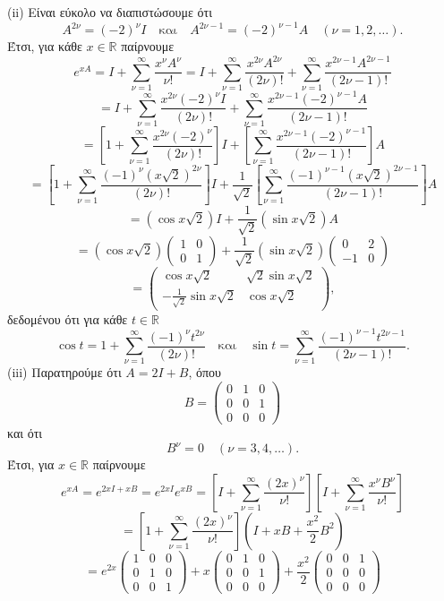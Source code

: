 \documentclass[11pt,a4paper,twoside]{book}
\begin{document}
(ii) Είναι εύκολο να διαπιστώσουμε ότι
\[
A^{2\nu} = (-2)^\nu I \quad \text{και} \quad A^{2\nu-1} = (-2)^{\nu-1} A \quad (\nu=1,2,\dots).
\]
Έτσι, για κάθε $x \in \mathbb{R}$ παίρνουμε
\[
e^{xA} = I + \sum_{\nu=1}^{\infty} \frac{x^\nu A^\nu}{\nu!} = I + \sum_{\nu=1}^{\infty} \frac{x^{2\nu} A^{2\nu}}{(2\nu)!} + \sum_{\nu=1}^{\infty} \frac{x^{2\nu-1} A^{2\nu-1}}{(2\nu-1)!}
\]
\[
= I + \sum_{\nu=1}^{\infty} \frac{x^{2\nu} (-2)^\nu I}{(2\nu)!} + \sum_{\nu=1}^{\infty} \frac{x^{2\nu-1} (-2)^{\nu-1} A}{(2\nu-1)!} 
\]
\[
= \left[ 1 + \sum_{\nu=1}^{\infty} \frac{x^{2\nu} (-2)^\nu}{(2\nu)!} \right] I + \left[ \sum_{\nu=1}^{\infty} \frac{x^{2\nu-1} (-2)^{\nu-1}}{(2\nu-1)!} \right] A 
\]
\[
= \left[ 1 + \sum_{\nu=1}^{\infty} \frac{(-1)^\nu (x\sqrt{2})^{2\nu}}{(2\nu)!} \right] I + \frac{1}{\sqrt{2}} \left[ \sum_{\nu=1}^{\infty} \frac{(-1)^{\nu-1} (x\sqrt{2})^{2\nu-1}}{(2\nu-1)!} \right] A 
\]
\[
= \left( \cos x\sqrt{2} \right) I + \frac{1}{\sqrt{2}} \left( \sin x\sqrt{2} \right) A 
\]
\[
= \left( \cos x\sqrt{2} \right) \begin{pmatrix} 1 & 0 \\ 0 & 1 \end{pmatrix} + \frac{1}{\sqrt{2}} \left( \sin x\sqrt{2} \right) \begin{pmatrix} 0 & 2 \\ -1 & 0 \end{pmatrix}
\]
\[
= \begin{pmatrix} \cos x\sqrt{2} & \sqrt{2} \sin x\sqrt{2} \\ -\frac{1}{\sqrt{2}} \sin x\sqrt{2} & \cos x\sqrt{2} \end{pmatrix},
\]
δεδομένου ότι για κάθε $t \in \mathbb{R}$
\[
\cos t = 1 + \sum_{\nu=1}^{\infty} \frac{(-1)^\nu t^{2\nu}}{(2\nu)!} \quad \text{και} \quad \sin t = \sum_{\nu=1}^{\infty} \frac{(-1)^{\nu-1} t^{2\nu-1}}{(2\nu-1)!}.
\]
(iii) Παρατηρούμε ότι $A = 2I+B$, όπου
\[
B = \begin{pmatrix} 0 & 1 & 0 \\ 0 & 0 & 1 \\ 0 & 0 & 0 \end{pmatrix}
\]
και ότι
\[
B^\nu = 0 \quad (\nu=3,4,\dots).
\]
Έτσι, για $x \in \mathbb{R}$ παίρνουμε
\[
e^{xA} = e^{2xI+xB} = e^{2xI} e^{xB} = \left[ I + \sum_{\nu=1}^{\infty} \frac{(2x)^\nu}{\nu!} \right] \left[ I + \sum_{\nu=1}^{\infty} \frac{x^\nu B^\nu}{\nu!} \right]
\]
\[
= \left[ 1 + \sum_{\nu=1}^{\infty} \frac{(2x)^\nu}{\nu!} \right] (I+xB+\frac{x^2}{2} B^2)
\]
\[
= e^{2x} \begin{pmatrix} 1 & 0 & 0 \\ 0 & 1 & 0 \\ 0 & 0 & 1 \end{pmatrix} + x \begin{pmatrix} 0 & 1 & 0 \\ 0 & 0 & 1 \\ 0 & 0 & 0 \end{pmatrix} + \frac{x^2}{2} \begin{pmatrix} 0 & 0 & 1 \\ 0 & 0 & 0 \\ 0 & 0 & 0 \end{pmatrix}
\]
\end{document}
